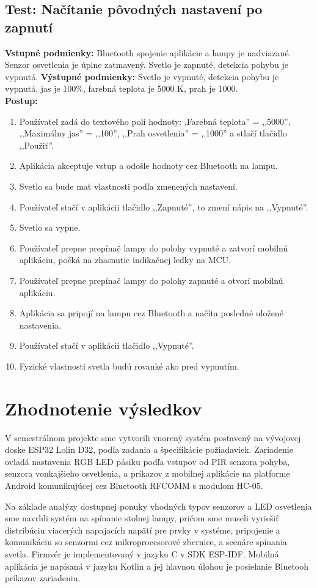 \documentclass[12pt, a4paper]{article}
\begin{document}
\subsection{Test: Načítanie pôvodných nastavení po zapnutí}
\noindent\textbf{Vstupné podmienky:} Bluetooth spojenie aplikácie a lampy je nadviazané. Senzor osvetlenia je úplne zatmavený. Svetlo je zapnuté, detekcia pohybu je vypnutá.
\textbf{Výstupné podmienky:} Svetlo je vypnuté, detekcia pohybu je vypnutá, jas je 100\%, farebná teplota je 5000 K, prah je 1000. \\
\textbf{Postup:}
\begin{enumerate}
\itemsep0pt
\item Používateľ zadá do textového polí hodnoty: ,Farebná teplota'' = ,,5000'', ,,Maximálny jas'' = ,,100'',  ,,Prah osvetlenia'' = ,,1000'' a stlačí tlačidlo ,,Použiť''.
\item Aplikácia akceptuje vstup a odošle hodnoty cez Bluetooth na lampu.
\item Svetlo sa bude mať vlastnosti podľa zmenených nastavení.
\item Používateľ stačí v aplikácii tlačidlo ,,Zapnuté'', to zmení nápis na ,,Vypnuté''.
\item Svetlo sa vypne.
\item Používateľ prepne prepínač lampy do polohy vypnuté a zatvorí mobilnú aplikáciu, počká na zhasnutie indikačnej ledky na MCU.
\item Používateľ prepne prepínač lampy do polohy zapnuté a otvorí mobilnú aplikáciu.
\item Aplikácia sa pripojí na lampu cez Bluetooth a načíta posledné uložené nastavenia. 
\item Používateľ stačí v aplikácii tlačidlo ,,Vypnuté''.
\item Fyzické vlastnosti svetla budú rovanké ako pred vypnutím.
\end{enumerate}

\section{Zhodnotenie výsledkov}
V semestrálnom projekte sme vytvorili vnorený systém postavený na vývojovej doske ESP32 Lolin D32, podľa zadania a špecifikácie požiadaviek. Zariadenie ovladá nastavenia RGB LED pásiku podľa vstupov od PIR senzora pohyba, senzora vonkajšieho osvetlenia, a príkazov z mobilnej aplikácie na platforme Android komunikujúcej cez Bluetooth RFCOMM s modulom HC-05. 

Na základe analýzy dostupnej ponuky vhodných typov senzorov a LED osvetlenia sme navrhli systém na spínanie stolnej lampy, pričom sme museli vyriešiť distribúciu viacerých napajacích napätí pre prvky v systéme, pripojenie a komunikáciu so senzormi cez mikroprocesorové zbernice, a scenáre spínania svetla. Firmvér je implementovaný v jazyku C v SDK ESP-IDF. Mobilná aplikácia je napísaná v jazyku Kotlin a jej hlavnou úlohou je posielanie Bluetooh príkazov zariadeniu. 
\end{document}
